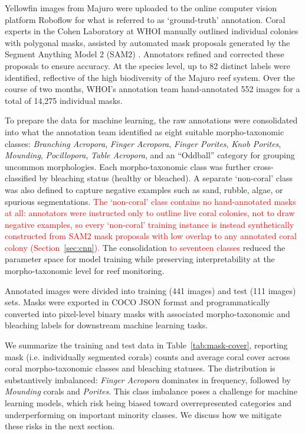 \documentclass[11pt]{elsarticle}
\newcommand{\revadd}[1]{\textcolor{red}{#1}}
\begin{document}
Yellowfin images from Majuro were uploaded to the online computer vision platform Roboflow \citep{roboflow2020} for what is referred to as `ground-truth' annotation. Coral experts in the Cohen Laboratory at WHOI manually outlined individual colonies with polygonal masks, assisted by automated mask proposals generated by the Segment Anything Model 2 (SAM2) \citep{ravi2024sam2}. Annotators refined and corrected these proposals to ensure accuracy. At the species level, up to 82 distinct labels were identified, reflective of the high biodiversity of the Majuro reef system. Over the course of two months, WHOI's annotation team hand-annotated 552 images for a total of 14,275 individual masks.

To prepare the data for machine learning, the raw annotations were consolidated into what the annotation team identified as eight suitable morpho-taxonomic classes: \emph{Branching Acropora}, \emph{Finger Acropora}, \emph{Finger Porites}, \emph{Knob Porites}, \emph{Mounding}, \emph{Pocillopora}, \emph{Table Acropora}, and an ``Oddball'' category for grouping uncommon morphologies. Each morpho-taxonomic class was further cross-classified by bleaching status (healthy or bleached). A separate `non-coral' class was also defined to capture negative examples such as sand, rubble, algae, or spurious segmentations. \revadd{The `non-coral' class contains no hand-annotated masks at all: annotators were instructed only to outline live coral colonies, not to draw negative examples, so every `non-coral' training instance is instead synthetically constructed from SAM2 mask proposals with low overlap to any annotated coral colony (Section~\ref{sec:cnn}).} The consolidation \revadd{to seventeen classes} reduced the parameter space for model training while preserving interpretability at the morpho-taxonomic level for reef monitoring.

Annotated images were divided into training (441 images) and test (111 images) sets. Masks were exported in COCO JSON format and programmatically converted into pixel-level binary masks with associated morpho-taxonomic and bleaching labels for downstream machine learning tasks.

We summarize the training and test data in Table~\ref{tab:mask-cover}, reporting mask (i.e. individually segmented corals) counts and average coral cover across coral morpho-taxonomic classes and bleaching statuses. The distribution is substantively imbalanced: \emph{Finger Acropora} dominates in frequency, followed by \emph{Mounding} corals and \textit{Porites}. This class imbalance poses a challenge for machine learning models, which risk being biased toward overrepresented categories and underperforming on important minority classes. We discuss how we mitigate these risks in the next section.
\end{document}
